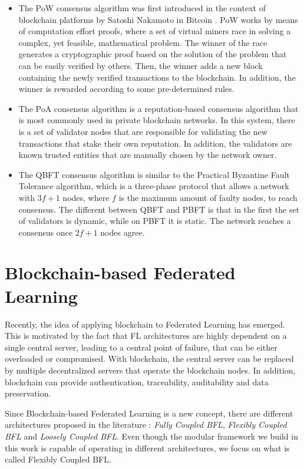 \begin{itemize}
    \item The PoW consensus algorithm was first introduced in the context of blockchain platforms by Satoshi Nakamoto in Bitcoin \cite{nakamoto2009bitcoin}. PoW works by means of computation effort proofs, where a set of virtual miners race in solving a complex, yet feasible, mathematical problem. The winner of the race generates a cryptographic proof based on the solution of the problem that can be easily verified by others. Then, the winner adds a new block containing the newly verified transactions to the blockchain. In addition, the winner is rewarded according to some pre-determined rules.
    
    \item The PoA consensus algorithm is a reputation-based consensus algorithm that is most commonly used in private blockchain networks. In this system, there is a set of validator nodes that are responsible for validating the new transactions that stake their own reputation. In addition, the validators are known trusted entities that are manually chosen by the network owner.

    \item The QBFT \cite{10.48550/arxiv.2002.03613} consensus algorithm is similar to the Practical Byzantine Fault Tolerance algorithm, which is a three-phase protocol that allows a network with $3f+1$ nodes, where $f$ is the maximum amount of faulty nodes, to reach consensus. The different between QBFT and PBFT is that in the first the set of validators is dynamic, while on PBFT it is static. The network reaches a consensus once $2f+1$ nodes agree.
\end{itemize}

\section{Blockchain-based Federated Learning}\label{background:bfl}

Recently, the idea of applying blockchain to Federated Learning has emerged. This is motivated by the fact that FL architectures are highly dependent on a single central server, leading to a central point of failure, that can be either overloaded or compromised. With blockchain, the central server can be replaced by multiple decentralized servers that operate the blockchain nodes. In addition, blockchain can provide authentication, traceability, auditability and data preservation.

Since Blockchain-based Federated Learning is a new concept, there are different architectures proposed in the literature \cite{10.48550/arxiv.2110.02182}: \textit{Fully Coupled BFL}, \textit{Flexibly Coupled BFL} and \textit{Loosely Coupled BFL}. Even though the modular framework we build in this work is capable of operating in different architectures, we focus on what is called Flexibly Coupled BFL.

